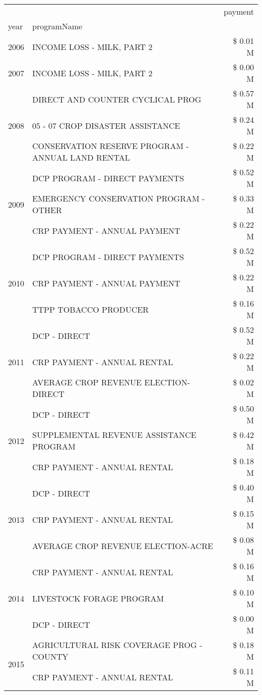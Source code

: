 \begin{tabular}{llr}
\toprule
 &  & payment \\
year & programName &  \\
\midrule
2006 & INCOME LOSS - MILK, PART 2 & \$ 0.01 M \\
\cline{1-3}
2007 & INCOME LOSS - MILK, PART 2 & \$ 0.00 M \\
\cline{1-3}
\multirow[t]{3}{*}{2008} & DIRECT AND COUNTER CYCLICAL PROG & \$ 0.57 M \\
 & 05 - 07 CROP DISASTER ASSISTANCE & \$ 0.24 M \\
 & CONSERVATION RESERVE PROGRAM - ANNUAL LAND RENTAL & \$ 0.22 M \\
\cline{1-3}
\multirow[t]{3}{*}{2009} & DCP PROGRAM - DIRECT PAYMENTS & \$ 0.52 M \\
 & EMERGENCY CONSERVATION PROGRAM - OTHER & \$ 0.33 M \\
 & CRP PAYMENT - ANNUAL PAYMENT & \$ 0.22 M \\
\cline{1-3}
\multirow[t]{3}{*}{2010} & DCP PROGRAM - DIRECT PAYMENTS & \$ 0.52 M \\
 & CRP PAYMENT - ANNUAL PAYMENT & \$ 0.22 M \\
 & TTPP TOBACCO PRODUCER & \$ 0.16 M \\
\cline{1-3}
\multirow[t]{3}{*}{2011} & DCP - DIRECT & \$ 0.52 M \\
 & CRP PAYMENT - ANNUAL RENTAL & \$ 0.22 M \\
 & AVERAGE CROP REVENUE ELECTION-DIRECT & \$ 0.02 M \\
\cline{1-3}
\multirow[t]{3}{*}{2012} & DCP - DIRECT & \$ 0.50 M \\
 & SUPPLEMENTAL REVENUE ASSISTANCE PROGRAM & \$ 0.42 M \\
 & CRP PAYMENT - ANNUAL RENTAL & \$ 0.18 M \\
\cline{1-3}
\multirow[t]{3}{*}{2013} & DCP - DIRECT & \$ 0.40 M \\
 & CRP PAYMENT - ANNUAL RENTAL & \$ 0.15 M \\
 & AVERAGE CROP REVENUE ELECTION-ACRE & \$ 0.08 M \\
\cline{1-3}
\multirow[t]{3}{*}{2014} & CRP PAYMENT - ANNUAL RENTAL & \$ 0.16 M \\
 & LIVESTOCK FORAGE PROGRAM & \$ 0.10 M \\
 & DCP - DIRECT & \$ 0.00 M \\
\cline{1-3}
\multirow[t]{2}{*}{2015} & AGRICULTURAL RISK COVERAGE PROG - COUNTY & \$ 0.18 M \\
 & CRP PAYMENT - ANNUAL RENTAL & \$ 0.11 M \\

\end{tabular}

